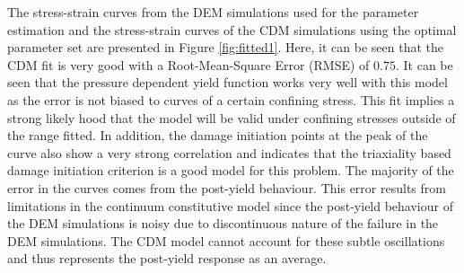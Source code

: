The stress-strain curves from the DEM simulations used for the parameter estimation and the stress-strain curves of the CDM simulations using the optimal parameter set are presented in Figure \ref{fig:fitted1}. Here, it can be seen that the CDM fit is very good with a Root-Mean-Square Error (RMSE) of $0.75$. It can be seen that the pressure dependent yield function works very well with this model as the error is not biased to curves of a certain confining stress. This fit implies a strong likely hood that the model will be valid under confining stresses outside of the range fitted. In addition, the damage initiation points at the peak of the curve also show a very strong correlation and indicates that the triaxiality based damage initiation criterion is a good model for this problem. The majority of the error in the curves comes from the post-yield behaviour. This error results from limitations in the continuum constitutive model since the post-yield behaviour of the DEM simulations is noisy due to discontinuous nature of the failure in the DEM simulations. The CDM model cannot account for these subtle oscillations and thus represents the post-yield response as an average. 
